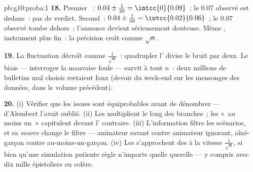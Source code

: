 \begin{solution}{pb:g10:proba:1}
\textbf{18.} Premier ~: 
$0.04 \pm \frac{1}{20} = \intcc{0}{0.09}$~; le $0.07$ observé est
dedans~: pas de verdict. Second~:
$0.04 \pm \frac{1}{50} = \intcc{0.02}{0.06}$~; le $0.07$ observé
tombe dehors~: l'annonce devient sérieusement douteuse. Même
, instrument plus fin~: la précision croît comme $\sqrt n$.

\textbf{19.} La fluctuation décroît comme $\frac{1}{\sqrt n}$~:
quadrupler l' divise le bruit par deux. Le biais ---
interroger la mauvaise foule --- survit à tout $n$~: deux millions de
bulletins mal choisis restaient faux (devoir du week-end sur les
mensonges des données, dans le volume précédent).

\textbf{20.} (i) Vérifier que les issues sont équiprobables avant de
dénombrer --- d'Alembert l'avait oublié. (ii) Les  multiplient
le long des branches~; les «~au moins un~» capitulent devant
l' contraire. (iii) L'information filtre les scénarios, et
sa \emph{source} change le filtre --- animateur savant contre
animateur ignorant, aîné-garçon contre au-moins-un-garçon. (iv) Les
 s'approchent des  à la vitesse
$\frac{1}{\sqrt n}$, si bien qu'une simulation patiente règle
n'importe quelle querelle --- y compris avec dix mille épistoliers en
colère.
\end{solution}
